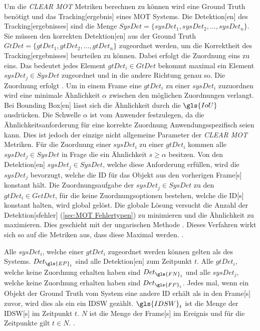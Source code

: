 Um die \textit{\acrshort{CLEAR} \gls{MOT}} Metriken berechnen zu können wird eine \gls{Ground Truth} benötigt und das \gls{Tracking}[ergebnis] eines \gls{MOT} Systems. Die \gls{Detektion}[en] des \gls{Tracking}[ergebnisses] sind die Menge \(SysDet = \{sysDet_1, sysDet_2, \dots, sysDet_n\}\). Sie müssen den korrekten \gls{Detektion}[en] aus der \gls{Ground Truth} \(GtDet = \{gtDet_1, gtDet_2, \dots, gtDet_n\}\) zugeordnet werden, um die Korrektheit des \gls{Tracking}[ergebnisses] beurteilen zu können. Dabei erfolgt die Zuordnung eins zu eins. Das bedeutet jedes Element \(gtDet_i \in GtDet\) bekommt maximal ein Element \(sysDet_j \in SysDet\) zugeordnet und in die andere Richtung genau so. Die Zuordnung erfolgt . Um in einem \gls{Frame} eine \(gtDet_i\) zu einer \(sysDet_i\) zuzuordnen wird eine minimale Ähnlichkeit \(\alpha\) zwischen den möglichen Zuordnungen verlangt. Bei \gls{Bounding Box}[en] lässt sich die Ähnlichkeit durch die \(\gls{IoU}\) ausdrücken. Die Schwelle \(\alpha\) ist vom Anwender festzulegen, da die Ähnlichkeitsanforderung für eine korrekte Zuordnung Anwendungsspezifisch seien kann. Dies ist jedoch der einzige nicht allgemeine Parameter der \textit{\acrshort{CLEAR} \gls{MOT}} Metriken. Für die Zuordnung einer \(sysDet_i\) zu einer \(gtDet_i\) kommen alle \(sysDet_j \in SysDet\) in Frage die ein Ähnlichkeit \(s \geq \alpha\) besitzen. Von den \gls{Detektion}[en] \(sysDet_j \in SysDet\), welche diese Anforderung erfüllen, wird die \(sysDet_j\) bevorzugt, welche die \acrshort{ID} für das Objekt aus den vorherigen \gls{Frame}[s] konstant hält. Die Zuordnungsaufgabe der \(sysDet_j \in SysDet\) zu den  \(gtDet_i \in GetDet\), für die keine Zuordnungsoptionen bestehen, welche die \acrshort{ID}[s] konstant halten, wird global gelöst. Die globale Lösung versucht die Anzahl der \gls{Detektion}[sfehler] (\autoref{sec:MOT Fehlertypen}) zu minimieren und die Ähnlichkeit zu maximieren. Dies geschieht mit der ungarischen Methode \cite{Kuhn.1955}. Dieses Verfahren wirkt sich so auf die Metriken aus, dass diese Maximal werden. \cite{CLEAR.2008, HOTA}. \par

Alle \(sysDet_i\), welche einer \(gtDet_i\) zugeordnet werden können gelten als  des Systems. \(Det_{\gls{EP}_t}\) sind alle  \gls{Detektion}[en] zum Zeitpunkt \(t\). Alle \(gtDet_i\), welche keine Zuordnung erhalten haben sind  \(Det_{\gls{FN}_t}\) und alle \(sysDet_j\), welche keine Zuordnung erhalten haben sind  \(Det_{\gls{FP}_t}\). Jedes mal, wenn ein Objekt der \gls{Ground Truth} vom System eine andere \acrshort{ID} erhält als in den \gls{Frame}[s] zuvor, wird dies als ein ein \gls{IDSW} gezählt. \(\gls{IDSW}_t\) ist die Menge der \gls{IDSW}[s] im Zeitpunkt \(t\). \(N\) ist die Menge der \gls{Frame}[s] im \gls{Ereignis} und für die Zeitpunkte gilt \(t \in N\). \cite{CLEAR.2008, IDF1}. \par

